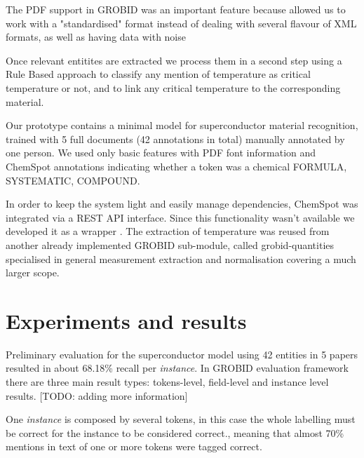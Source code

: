 \documentclass{article}
\begin{document}
The PDF support in GROBID was an important feature because allowed us to work with a "standardised" format instead of dealing with several flavour of XML formats, as well as having data with noise 

Once relevant entitites are extracted we process them in a second step using a Rule Based approach to classify any mention of temperature as critical temperature or not, and to link any critical temperature to the corresponding material. 

Our prototype contains a minimal model for superconductor material recognition, trained with 5 full documents (42 annotations in total) manually annotated by one person. We used only basic features with PDF font information and ChemSpot \cite{10.1093/bioinformatics/bts183} annotations indicating whether a token was a chemical FORMULA, SYSTEMATIC, COMPOUND. 

In order to keep the system light and easily manage dependencies, ChemSpot was integrated via a REST API interface. Since this functionality wasn't available we developed it as a wrapper \cite{chemspot-web}.    
The extraction of temperature was reused from another already implemented GROBID sub-module, called grobid-quantities\cite{grobid-quantities} specialised in general measurement extraction and normalisation covering a much larger scope. 

\section{Experiments and results}
\label{sec:experiments-results}

Preliminary evaluation for the superconductor model using 42 entities in 5 papers resulted in about 68.18\% recall per \textit{instance}. 
In GROBID evaluation framework there are three main result types: tokens-level, field-level and instance level results. [TODO: adding more information]

One \textit{instance} is composed by several tokens, in this case the whole labelling must be correct for the instance to be considered correct., meaning that almost 70\% mentions in text of one or more tokens were tagged correct. 
\end{document}
